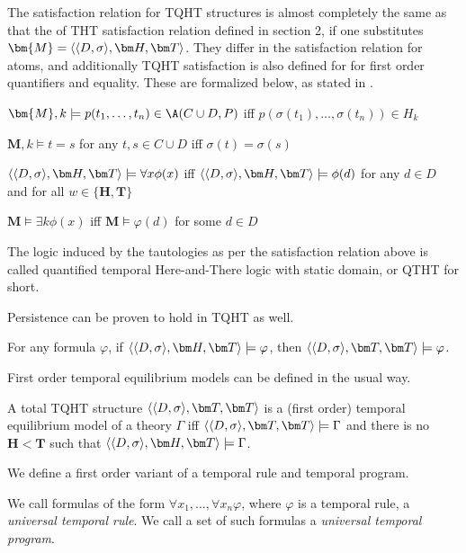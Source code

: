The satisfaction relation for TQHT structures is almost completely the
same as that the of THT satisfaction relation defined in section 2, if
one substitutes $\bm{M}=\qthandt$. They differ in the satisfaction
relation for atoms, and additionally TQHT satisfaction is also defined
for for first order quantifiers and equality. These are formalized
below, as stated in \cite{agcapevidi17a}.

\begin{description}
  \item $\bm{M},k \models p(t_1, \dots, t_n) \in \A(C \cup D,P)$ iff $p(\sigma(t_1), \dots, \sigma(t_n))\in H_k$
  \item $\bm{M},k \models t = s$ for any $t,s \in C \cup D$ iff $\sigma(t) = \sigma(s)$
  \item $\qthandt \models \forall x \phi(x)$ iff $\qthandt \models \phi(d)$ for any $d \in D$ and for all $w \in \{\bm{H}, \bm{T}\}$ 
  \item $\bm{M} \models \exists k \phi(x)$ iff $\bm{M} \models \varphi(d)$ for some $d \in D$
\end{description}

The logic induced by the tautologies as per the satisfaction relation
above is called quantified temporal Here-and-There logic with static
domain, or QTHT for short.

Persistence can be proven to hold in TQHT as well.

\begin{proposition}
  For any formula $\varphi$, if $\qthandt \models \varphi$, then
  $\qttandt \models \varphi$.
\end{proposition}

First order temporal equilibrium models can be defined in the usual way.

\begin{definition}
  A total TQHT structure $\qttandt$ is a (first order) temporal
  equilibrium model of a theory $\Gamma$ iff $\qttandt \models \Gamma$
  and there is no $\bm{H} < \bm{T}$ such that
  $\qthandt \models \Gamma$.
\end{definition}

We define a first order variant of a temporal rule and temporal program.

\begin{definition} We call
  formulas of the form $\forall x_1, \dots, \forall x_n \varphi$,
  where $\varphi$ is a temporal rule, a \emph{universal temporal rule}. We
  call a set of such formulas a \emph{universal temporal program}.
\end{definition}

